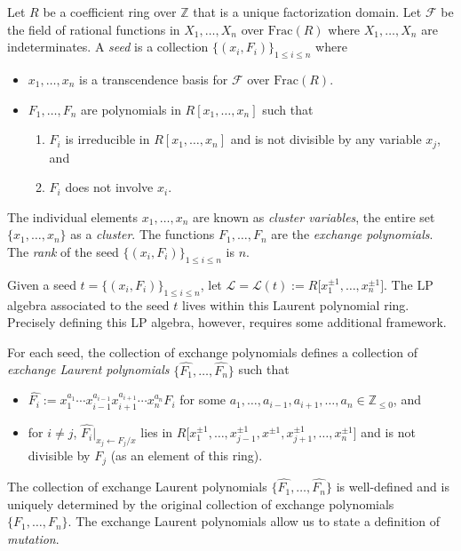 \documentclass[pdftex]{sigma}
\numberwithin{equation}{section}
\newcommand{\Z}{\mathbb{Z}}
\begin{document}
\begin{Definition}[{cf.\ \cite[Section~2.1]{LP-12}}]
\label{defn:LP-alg}
Let $R$ be a coefficient ring over $\Z$ that is a unique factorization domain. Let $\mathcal{F}$ be the field of rational functions in $X_1,\dots,X_n$ over $\text{Frac}(R)$ where $X_1,\dots,X_n$ are indeterminates. A \emph{seed} is a collection $\{(x_i,F_i)\}_{1\leq i\leq n}$ where
\begin{itemize}\itemsep=0pt
 \item $x_1,\dots,x_n$ is a transcendence basis for $\mathcal{F}$ over $\text{Frac}(R)$.
 \item $F_1,\dots, F_n$ are polynomials in $R[x_1,\dots,x_n]$ such that
 \begin{enumerate}\itemsep=0pt
 \item[(LP1)] $F_i$ is irreducible in $R[x_1,\dots,x_n]$ and is not divisible by any variable $x_j$, and
 \item[(LP2)] $F_i$ does not involve $x_i$.
 \end{enumerate}
\end{itemize}
The individual elements $x_1, \dots, x_n$ are known as \emph{cluster variables}, the entire set $\{ x_1, \dots, x_n \}$ as a \emph{cluster}. The functions $F_1,\dots,F_n$ are the \emph{exchange polynomials}. The \emph{rank} of the seed $\{ (x_i, F_i) \}_{1 \leq i \leq n}$ is $n$.
\end{Definition}
Given a seed $t = \{(x_i,F_i)\}_{1\leq i\leq n}$, let $ \mathcal{L} = \mathcal{L}(t) := R\big[x_1^{\pm 1}, \dots, x_n^{\pm 1}\big]$. The LP algebra associated to the seed $t$ lives within this Laurent polynomial ring. Precisely defining this LP algebra, however, requires some additional framework.

For each seed, the collection of exchange polynomials defines a collection of \emph{exchange Laurent polynomials} $\{ \hat{F_1}, \dots, \hat{F_n} \}$ such that
\begin{itemize}\itemsep=0pt
 \item $\hat{F_i} := x_1^{a_1} \cdots x_{i-1}^{a_{i-1}}x_{i+1}^{a_{i+1}}\cdots x_n^{a_n}F_i$ for some $a_1, \dots, a_{i-1},a_{i+1},\dots,a_n \in \mathbb{Z}_{\leq 0}$, and
 \item for $i \neq j$, $\hat{F_i}\big|_{x_j \leftarrow F_j/x}$ lies in $R\big[x_1^{\pm 1}, \dots, x_{j-1}^{\pm 1},x^{\pm 1}, x_{j+1}^{\pm 1}, \dots, x_n^{\pm 1}\big]$ and is not divisible by $F_j$ (as an element of this ring).
\end{itemize}
The collection of exchange Laurent polynomials $\big\{ \hat{F_1}, \dots, \hat{F_n} \big\}$ is well-defined and is uniquely determined by the original collection of exchange polynomials $\{ F_1,\dots,F_n \}$. The exchange Laurent polynomials allow us to state a definition of \emph{mutation}.
\end{document}
